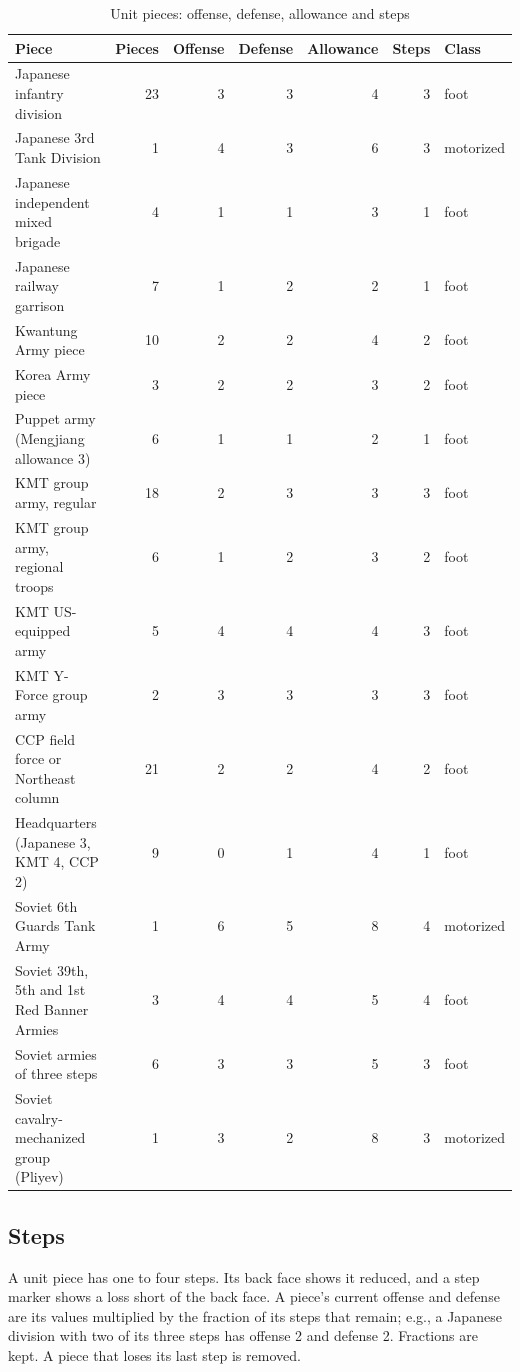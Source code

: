 \documentclass[11pt]{article}
\begin{document}
\begin{table}[ht]
\centering\small
\begin{tabular}{@{}lrrrrrl@{}}
\toprule
Piece & Pieces & Offense & Defense & Allowance & Steps & Class \\
\midrule
Japanese infantry division & 23 & 3 & 3 & 4 & 3 & foot \\
Japanese 3rd Tank Division & 1 & 4 & 3 & 6 & 3 & motorized \\
Japanese independent mixed brigade & 4 & 1 & 1 & 3 & 1 & foot \\
Japanese railway garrison & 7 & 1 & 2 & 2 & 1 & foot \\
Kwantung Army piece & 10 & 2 & 2 & 4 & 2 & foot \\
Korea Army piece & 3 & 2 & 2 & 3 & 2 & foot \\
Puppet army (Mengjiang allowance 3) & 6 & 1 & 1 & 2 & 1 & foot \\
KMT group army, regular & 18 & 2 & 3 & 3 & 3 & foot \\
KMT group army, regional troops & 6 & 1 & 2 & 3 & 2 & foot \\
KMT US-equipped army & 5 & 4 & 4 & 4 & 3 & foot \\
KMT Y-Force group army & 2 & 3 & 3 & 3 & 3 & foot \\
CCP field force or Northeast column & 21 & 2 & 2 & 4 & 2 & foot \\
Headquarters (Japanese 3, KMT 4, CCP 2) & 9 & 0 & 1 & 4 & 1 & foot \\
Soviet 6th Guards Tank Army & 1 & 6 & 5 & 8 & 4 & motorized \\
Soviet 39th, 5th and 1st Red Banner Armies & 3 & 4 & 4 & 5 & 4 & foot \\
Soviet armies of three steps & 6 & 3 & 3 & 5 & 3 & foot \\
Soviet cavalry-mechanized group (Pliyev) & 1 & 3 & 2 & 8 & 3 & motorized \\
\bottomrule
\end{tabular}
\caption{Unit pieces: offense, defense, allowance and steps}\label{tab:pieces}
\end{table}

\subsection{Steps}\label{sub:steps}
A unit piece has one to four steps. Its back face shows it reduced, and a step marker shows a loss short of the back face. A piece's current offense and defense are its values multiplied by the fraction of its steps that remain; e.g., a Japanese division with two of its three steps has offense 2 and defense 2. Fractions are kept. A piece that loses its last step is removed.
\end{document}
